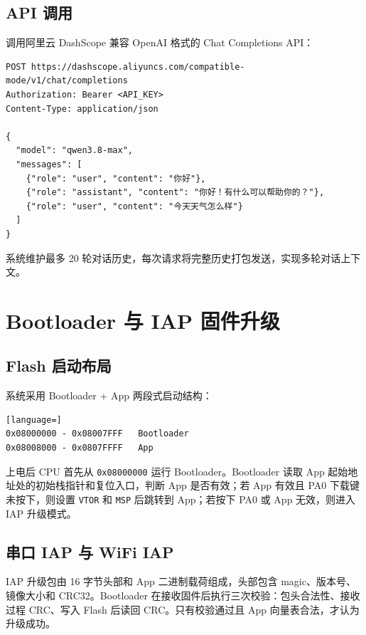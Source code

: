 \documentclass[12pt,a4paper]{ctexart}
\begin{document}
\subsection{API 调用}

调用阿里云 DashScope 兼容 OpenAI 格式的 Chat Completions API：

\begin{lstlisting}
POST https://dashscope.aliyuncs.com/compatible-mode/v1/chat/completions
Authorization: Bearer <API_KEY>
Content-Type: application/json

{
  "model": "qwen3.8-max",
  "messages": [
    {"role": "user", "content": "你好"},
    {"role": "assistant", "content": "你好！有什么可以帮助你的？"},
    {"role": "user", "content": "今天天气怎么样"}
  ]
}
\end{lstlisting}

系统维护最多 20 轮对话历史，每次请求将完整历史打包发送，实现多轮对话上下文。

\section{Bootloader 与 IAP 固件升级}

\subsection{Flash 启动布局}

系统采用 Bootloader + App 两段式启动结构：

\begin{lstlisting}[language=]
0x08000000 - 0x08007FFF   Bootloader
0x08008000 - 0x0807FFFF   App
\end{lstlisting}

上电后 CPU 首先从 \texttt{0x08000000} 运行 Bootloader。Bootloader 读取 App 起始地址处的初始栈指针和复位入口，判断 App 是否有效；若 App 有效且 PA0 下载键未按下，则设置 \texttt{VTOR} 和 \texttt{MSP} 后跳转到 App；若按下 PA0 或 App 无效，则进入 IAP 升级模式。

\subsection{串口 IAP 与 WiFi IAP}

IAP 升级包由 16 字节头部和 App 二进制载荷组成，头部包含 magic、版本号、镜像大小和 CRC32。Bootloader 在接收固件后执行三次校验：包头合法性、接收过程 CRC、写入 Flash 后读回 CRC。只有校验通过且 App 向量表合法，才认为升级成功。
\end{document}
